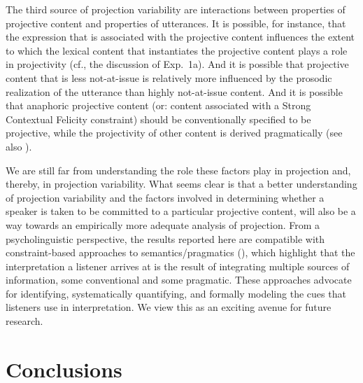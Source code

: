 \documentclass[11pt,fleqn]{article}
\newcommand{\6}{\mbox{$[\hspace*{-.6mm}[$}}
\newcommand{\9}{\mbox{$]\hspace*{-.6mm}]$}}
\begin{document}
The third source of projection variability are interactions between properties of projective content and properties of utterances. It is possible, for instance, that the expression that is associated with the projective content influences the extent to which the lexical content that instantiates the projective content plays a role in projectivity (cf., the discussion of Exp.~1a). And it is possible that projective content that is less not-at-issue is relatively more influenced by the prosodic realization of the utterance than highly not-at-issue content. And it is possible that anaphoric projective content (or: content associated with a Strong Contextual Felicity constraint) should be conventionally specified to be projective, while the projectivity of other content is derived pragmatically (see also \citealt{brst-ar}).

We are still far from understanding the role these factors play in projection and, thereby, in projection variability. What seems clear is that a better understanding of projection variability and the factors involved in determining whether a speaker is taken to be committed to a particular projective content, will also be a way towards an empirically more adequate analysis of projection. From a psycholinguistic perspective, the results reported here are compatible with constraint-based approaches to semantics/pragmatics (\citealt{degentanenhaus2015}), which highlight that the interpretation a listener arrives at is the result of integrating multiple sources of information, some conventional and some pragmatic. These approaches advocate for identifying, systematically quantifying, and formally modeling the cues that listeners use in interpretation. We view this as an exciting avenue for future research.


\section{Conclusions}\label{s6}
\end{document}
